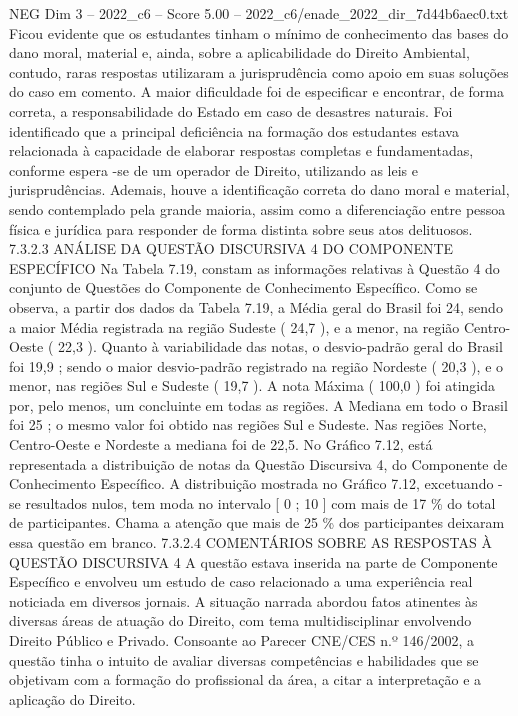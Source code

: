 \begin{textsample}{NEG Dim 3 – 2022\_c6 – Score 5.00 – 2022\_c6/enade\_2022\_dir\_7d44b6aec0.txt}
Ficou evidente que os estudantes tinham o mínimo de conhecimento das bases do dano moral, material e, ainda, sobre a aplicabilidade do Direito Ambiental, contudo, raras respostas utilizaram a jurisprudência como apoio em suas soluções do caso em comento.
A maior dificuldade foi de especificar e encontrar, de forma correta, a responsabilidade do Estado em caso de desastres naturais.
Foi identificado que a principal deficiência na formação dos estudantes estava relacionada à capacidade de elaborar respostas completas e fundamentadas, conforme espera -se de um operador de Direito, utilizando as leis e jurisprudências.
Ademais, houve a identificação correta do dano moral e material, sendo contemplado pela grande maioria, assim como a diferenciação entre pessoa física e jurídica para responder de forma distinta sobre seus atos delituosos. 7.3.2.3 ANÁLISE DA QUESTÃO DISCURSIVA 4 DO COMPONENTE ESPECÍFICO Na Tabela 7.19, constam as informações relativas à Questão 4 do conjunto de Questões do Componente de Conhecimento Específico.
Como se observa, a partir dos dados da Tabela 7.19, a Média geral do Brasil foi 24, sendo a maior Média registrada na região Sudeste ( 24,7 ), e a menor, na região Centro-Oeste ( 22,3 ).
Quanto à variabilidade das notas, o desvio-padrão geral do Brasil foi 19,9 ; sendo o maior desvio-padrão registrado na região Nordeste ( 20,3 ), e o menor, nas regiões Sul e Sudeste ( 19,7 ).
A nota Máxima ( 100,0 ) foi atingida por, pelo menos, um concluinte em todas as regiões.
A Mediana em todo o Brasil foi 25 ; o mesmo valor foi obtido nas regiões Sul e Sudeste.
Nas regiões Norte, Centro-Oeste e Nordeste a mediana foi de 22,5.
No Gráfico 7.12, está representada a distribuição de notas da Questão Discursiva 4, do Componente de Conhecimento Específico.
A distribuição mostrada no Gráfico 7.12, excetuando -se resultados nulos, tem moda no intervalo [ 0 ; 10 ] com mais de 17 \% do total de participantes.
Chama a atenção que mais de 25 \% dos participantes deixaram essa questão em branco. 7.3.2.4 COMENTÁRIOS SOBRE AS RESPOSTAS À QUESTÃO DISCURSIVA 4 A questão estava inserida na parte de Componente Específico e envolveu um estudo de caso relacionado a uma experiência real noticiada em diversos jornais.
A situação narrada abordou fatos atinentes às diversas áreas de atuação do Direito, com tema multidisciplinar envolvendo Direito Público e Privado.
Consoante ao Parecer CNE/CES n.º 146/2002, a questão tinha o intuito de avaliar diversas competências e habilidades que se objetivam com a formação do profissional da área, a citar a interpretação e a aplicação do Direito.

\end{textsample}
